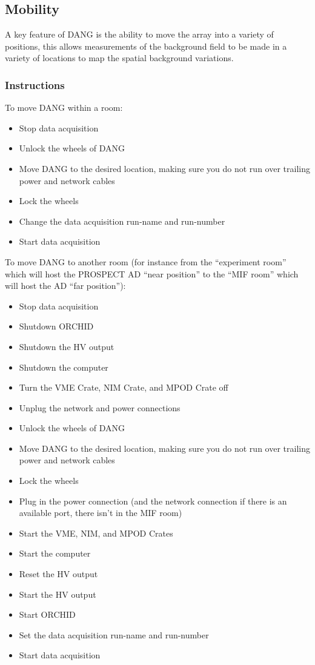 \documentclass[onecolumn, 10pt, letterpaper, twoside]{article}
\begin{document}
\subsection{Mobility}
A key feature of DANG is the ability to move the array into a variety of positions, this allows measurements of the background field to be made in a variety of locations to map the spatial background variations.

\subsubsection{Instructions}

To move DANG within a room:
\begin{itemize}
\item Stop data acquisition
\item Unlock the wheels of DANG
\item Move DANG to the desired location, making sure you do not run over trailing power and network cables
\item Lock the wheels
\item Change the data acquisition run-name and run-number
\item Start data acquisition
\end{itemize}

To move DANG to another room (for instance from the ``experiment room'' which will host the PROSPECT AD ``near position'' to the ``MIF room'' which will host the AD ``far position''):
\begin{itemize}
\item Stop data acquisition
\item Shutdown ORCHID
\item Shutdown the HV output
\item Shutdown the computer
\item Turn the VME Crate, NIM Crate, and MPOD Crate off
\item Unplug the network and power connections
\item Unlock the wheels of DANG
\item Move DANG to the desired location, making sure you do not run over trailing power and network cables
\item Lock the wheels
\item Plug in the power connection (and the network connection if there is an available port, there isn't in the MIF room)
\item Start the VME, NIM, and MPOD Crates
\item Start the computer
\item Reset the HV output
\item Start the HV output
\item Start ORCHID
\item Set the data acquisition run-name and run-number
\item Start data acquisition
\end{itemize}
\end{document}

